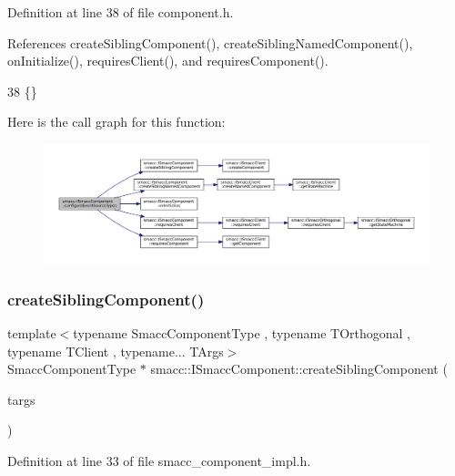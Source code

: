 Definition at line 38 of file component.\+h.



References create\+Sibling\+Component(), create\+Sibling\+Named\+Component(), on\+Initialize(), requires\+Client(), and requires\+Component().


\begin{DoxyCode}
38 \{\}
\end{DoxyCode}
Here is the call graph for this function\+:
\nopagebreak
\begin{figure}[H]
\begin{center}
\leavevmode
\includegraphics[width=350pt]{classsmacc_1_1ISmaccComponent_ad1c9ede43be1f83c10c6e7a2e14db8d3_cgraph}
\end{center}
\end{figure}
\mbox{\label{classsmacc_1_1ISmaccComponent_a85a3f70369d18176aa0a28c3ba31b945}} 
\subsubsection{\texorpdfstring{create\+Sibling\+Component()}{createSiblingComponent()}}
{\footnotesize\ttfamily template$<$typename Smacc\+Component\+Type , typename T\+Orthogonal , typename T\+Client , typename... T\+Args$>$ \\
Smacc\+Component\+Type $\ast$ smacc\+::\+I\+Smacc\+Component\+::create\+Sibling\+Component (\begin{DoxyParamCaption}\item[{T\+Args...}]{targs }\end{DoxyParamCaption})\hspace{0.3cm}{\ttfamily [protected]}}



Definition at line 33 of file smacc\+\_\+component\+\_\+impl.\+h.



